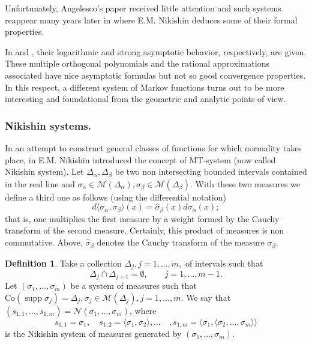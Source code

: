 \documentclass{amsart}
\theoremstyle{definition}
\newtheorem{defi}{\sc Definition}[section]
\theoremstyle{remark}
\newcommand{\la}{\langle}
\newcommand{\ra}{\rangle}
\newcommand{\supp}{\operatorname{supp }}
\begin{document}
Unfortunately, Angelesco's paper received little attention and such systems  reappear many years later in \cite{Nik1} where E.M. Nikishin  deduces some of their formal properties.

In \cite{GR} and \cite{Apt1}, their logarithmic and strong asymptotic behavior, respectively, are given. These multiple orthogonal polynomials and the rational approximations associated have nice asymptotic formulas but not so good convergence properties. In this respect, a different  system of Markov functions turns out to be more interesting and foundational from the geometric and analytic points of view.

\subsubsection{Nikishin systems.}  In an attempt to construct general classes of functions for which normality takes place, in \cite{Nik} E.M. Nikishin introduced the concept of MT-system (now called Nikishin system). Let $\Delta_{\alpha}, \Delta_{\beta}$ be two non intersecting bounded intervals contained in the real line and $\sigma_{\alpha} \in {\mathcal{M}}(\Delta_{\alpha}), \sigma_{\beta} \in {\mathcal{M}}(\Delta_{\beta})$. With these two measures we define a third one as follows (using the differential notation)
\[ d \la \sigma_{\alpha},\sigma_{\beta} \ra (x) = \widehat{\sigma}_{\beta}(x) d\sigma_{\alpha}(x);
\]
that is, one multiplies the first measure by a weight formed by the Cauchy transform of the second measure. Certainly, this product of measures is non commutative. Above, $\widehat{\sigma}_{\beta}$ denotes the Cauchy transform of the measure $\sigma_{\beta}$.

\begin{defi} \label{Nikishin} Take a collection  $\Delta_j, j=1,\ldots,m,$ of intervals such that
\[ \Delta_j \cap \Delta_{j+1} = \emptyset, \qquad j=1,\ldots,m-1.
\]
Let $(\sigma_1,\ldots,\sigma_m)$ be a system of measures such that $\mbox{Co}(\supp \sigma_j) = \Delta_j, \sigma_j \in {\mathcal{M}}(\Delta_j), j=1,\ldots,m.$
We say that $(s_{1,1},\ldots,s_{1,m}) = {\mathcal{N}}(\sigma_1,\ldots,\sigma_m)$, where
\[ s_{1,1} = \sigma_{1}, \quad s_{1,2} = \la \sigma_1,\sigma_2 \ra, \ldots \quad , s_{1,m} = \la \sigma_1,\la \sigma_2,\ldots,\sigma_m \ra \ra
\]
is the Nikishin system of measures generated by $(\sigma_1,\ldots,\sigma_m)$.
\end{defi}
\end{document}
